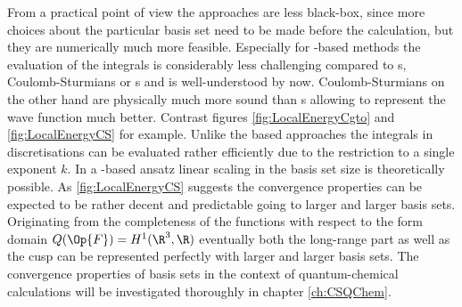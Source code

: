 From a practical point of view
the \ACO approaches are less black-box,
since more choices about the particular basis set need to be made before the calculation,
but they are numerically much more feasible.
Especially for \cGTO-based methods the evaluation of the integrals
is considerably less challenging compared to {\STO}s, Coulomb-Sturmians
or {\FE}s and is well-understood by now.
Coulomb-Sturmians on the other hand are physically much more sound than
{\cGTO}s allowing to represent the wave function
much better.
Contrast figures \vref{fig:LocalEnergyCgto} and \vref{fig:LocalEnergyCS} for example.
Unlike the \STO based approaches
the integrals in \CS discretisations can be evaluated rather efficiently
due to the restriction to a single exponent $k$.
In a \contraction-based ansatz linear scaling in the basis set size
is theoretically possible.
As \ref{fig:LocalEnergyCS} suggests the convergence properties
can be expected to be rather decent and predictable
going to larger and larger basis sets.
Originating from the completeness of the \CS functions
with respect to the form domain $Q(\Op{F}) = H^1(\R^3,\R)$
eventually both the long-range part as well as the cusp can be represented
perfectly with larger and larger basis sets.
The convergence properties of \CS basis sets in the context of
quantum-chemical calculations will be investigated
thoroughly in chapter \vref{ch:CSQChem}.
